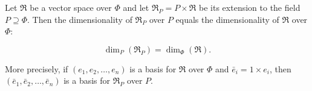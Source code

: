 Let $\mathfrak{R}$ be a vector space over $\Phi$ and let $\mathfrak{R}_P = P \times \mathfrak{R}$ be its extension to the field $P \supseteq \Phi$. Then the dimensionality of $\mathfrak{R}_P$ over $P$ equals the dimensionality of $\mathfrak{R}$ over $\Phi$:

$$\dim_P(\mathfrak{R}_P) = \dim_\Phi(\mathfrak{R}).$$

More precisely, if $(e_1, e_2, \dots, e_n)$ is a basis for $\mathfrak{R}$ over $\Phi$ and $\bar{e}_i = 1 \times e_i$, then $(\bar{e}_1, \bar{e}_2, \dots, \bar{e}_n)$ is a basis for $\mathfrak{R}_P$ over $P$.
